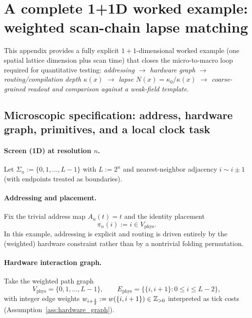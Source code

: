 \section[A complete 1+1D worked example]{A complete 1+1D worked example:\\
weighted scan-chain lapse matching}
\label{app:worked_1p1d}

This appendix provides a fully explicit $1{+}1$-dimensional worked example (one spatial lattice dimension plus scan time) that closes the micro-to-macro loop required for quantitative testing:
\emph{addressing $\rightarrow$ hardware graph $\rightarrow$ routing/compilation depth $\kappa(x)$ $\rightarrow$ lapse $N(x)=\kappa_0/\kappa(x)$ $\rightarrow$ coarse-grained readout and comparison against a weak-field template}.

\subsection{Microscopic specification: address, hardware graph, primitives, and a local clock task}
\label{app:worked_1p1d_micro}

\paragraph{Screen (1D) at resolution \texorpdfstring{$n$}{n}.}
Let $\Sigma_n:=\{0,1,\dots,L-1\}$ with $L:=2^n$ and nearest-neighbor adjacency $i\sim i\pm 1$ (with endpoints treated as boundaries).

\paragraph{Addressing and placement.}
Fix the trivial address map $A_n(t)=t$ and the identity placement
\[
\pi_n(i):=i\in V_{\mathrm{phys}}.
\]
In this example, addressing is explicit and routing is driven entirely by the (weighted) hardware constraint rather than by a nontrivial folding permutation.

\paragraph{Hardware interaction graph.}
Take the weighted path graph
\[
V_{\mathrm{phys}}=\{0,1,\dots,L-1\},
\qquad
E_{\mathrm{phys}}=\bigl\{\{i,i+1\}:0\le i\le L-2\bigr\},
\]
with integer edge weights $w_{i+\frac12}:=w(\{i,i+1\})\in\mathbb{Z}_{>0}$ interpreted as tick costs (Assumption~\ref{ass:hardware_graph}).

